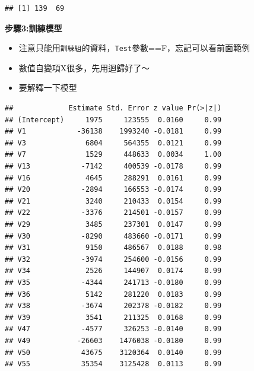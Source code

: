 \documentclass[]{book}
\newenvironment{Shaded}{\begin{snugshade}}{\end{snugshade}}
\newcommand{\DataTypeTok}[1]{\textcolor[rgb]{0.13,0.29,0.53}{#1}}
\newcommand{\KeywordTok}[1]{\textcolor[rgb]{0.13,0.29,0.53}{\textbf{#1}}}
\newcommand{\NormalTok}[1]{#1}
\newcommand{\OperatorTok}[1]{\textcolor[rgb]{0.81,0.36,0.00}{\textbf{#1}}}
\newcommand{\StringTok}[1]{\textcolor[rgb]{0.31,0.60,0.02}{#1}}
\providecommand{\tightlist}{%
  \setlength{\itemsep}{0pt}\setlength{\parskip}{0pt}}
\begin{document}
\begin{verbatim}
## [1] 139  69
\end{verbatim}

\textbf{步驟3:訓練模型}

\begin{itemize}
\tightlist
\item
  注意只能用\texttt{訓練組}的資料，\texttt{Test}參數==F，忘記可以看前面範例
\item
  數值自變項X很多，先用迴歸好了～
\item
  要解釋一下模型
\end{itemize}

\begin{Shaded}
\end{Shaded}

\begin{verbatim}
##             Estimate Std. Error z value Pr(>|z|)
## (Intercept)     1975     123555  0.0160     0.99
## V1            -36138    1993240 -0.0181     0.99
## V3              6804     564355  0.0121     0.99
## V7              1529     448633  0.0034     1.00
## V13            -7142     400539 -0.0178     0.99
## V16             4645     288291  0.0161     0.99
## V20            -2894     166553 -0.0174     0.99
## V21             3240     210433  0.0154     0.99
## V22            -3376     214501 -0.0157     0.99
## V29             3485     237301  0.0147     0.99
## V30            -8290     483660 -0.0171     0.99
## V31             9150     486567  0.0188     0.98
## V32            -3974     254600 -0.0156     0.99
## V34             2526     144907  0.0174     0.99
## V35            -4344     241713 -0.0180     0.99
## V36             5142     281220  0.0183     0.99
## V38            -3674     202378 -0.0182     0.99
## V39             3541     211325  0.0168     0.99
## V47            -4577     326253 -0.0140     0.99
## V49           -26603    1476038 -0.0180     0.99
## V50            43675    3120364  0.0140     0.99
## V55            35354    3125428  0.0113     0.99
\end{verbatim}
\end{document}
